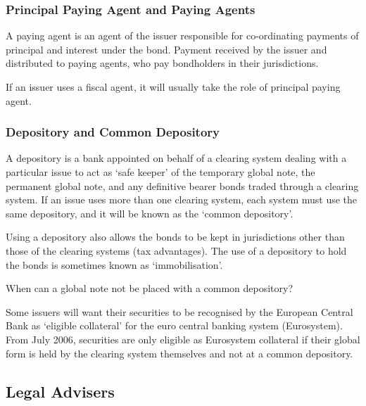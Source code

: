 \documentclass[
]{article}
\newenvironment{env-b9c392e1-ee61-46f3-89ba-c38ff5491eeb}
{
    \savenotes\tcolorbox[blanker,breakable,left=5pt,borderline west={2pt}{-4pt}{gray}]
}
{
    \endtcolorbox\spewnotes
}
\begin{document}
\hypertarget{principal-paying-agent-and-paying-agents}{%
\subsubsection{Principal Paying Agent and Paying
Agents}\label{principal-paying-agent-and-paying-agents}}

A paying agent is an agent of the issuer responsible for co-ordinating
payments of principal and interest under the bond. Payment received by
the issuer and distributed to paying agents, who pay bondholders in
their jurisdictions.

If an issuer uses a fiscal agent, it will usually take the role of
principal paying agent.

\hypertarget{depository-and-common-depository}{%
\subsubsection{Depository and Common
Depository}\label{depository-and-common-depository}}

A depository is a bank appointed on behalf of a clearing system dealing
with a particular issue to act as `safe keeper' of the temporary global
note, the permanent global note, and any definitive bearer bonds traded
through a clearing system. If an issue uses more than one clearing
system, each system must use the same depository, and it will be known
as the `common depository'.

Using a depository also allows the bonds to be kept in jurisdictions
other than those of the clearing systems (tax advantages). The use of a
depository to hold the bonds is sometimes known as `immobilisation'.

\begin{env-b9c392e1-ee61-46f3-89ba-c38ff5491eeb}

When can a global note not be placed with a common depository?

Some issuers will want their securities to be recognised by the European
Central Bank as `eligible collateral' for the euro central banking
system (Eurosystem). From July 2006, securities are only eligible as
Eurosystem collateral if their global form is held by the clearing
system themselves and not at a common depository.

\end{env-b9c392e1-ee61-46f3-89ba-c38ff5491eeb}

\hypertarget{legal-advisers}{%
\subsection{Legal Advisers}\label{legal-advisers}}
\end{document}
